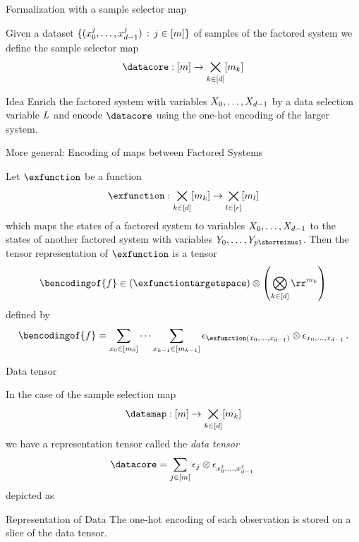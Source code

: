 \documentclass{beamer}
\begin{document}
    \begin{frame}{Formalization with a sample selector map}

        Given a dataset $\{({x_{0}^{j},\ldots,x_{d-1}^{j}}) \, : \, j\in[m] \}$ of samples of the factored system we define the sample selector map
        \[ \datacore : [\datanum] \rightarrow \facstates \]

        \medskip

        \begin{block}{Idea}
            Enrich the factored system with variables $X_{0},\ldots,X_{d-1}$ by a data selection variable $L$ and encode $\datacore$ using the one-hot encoding of the larger system.
        \end{block}


    \end{frame}


    \begin{frame}{More general: Encoding of maps between Factored Systems}

        \begin{definition}
            Let $\exfunction$ be a function
            \[ \exfunction : \facstates \rightarrow  \secfacstates \]
            which maps the states of a factored system to variables $X_{0},\ldots,X_{d-1}$ to the states of another factored system with variables $\seccatvariables$.
            Then the tensor representation of $\exfunction$ is a tensor
            \[ \bencodingof{\exformula} \in \left(\exfunctiontargetspace\right)  \otimes \left(\facspace\right) \]
            defined by
            \[ \bencodingof{\exformula} = \sum_{\catindexofin{0}} \cdots  \sum_{\catindexofin{\atomenumerator-1}}  \onehotmapof{\exfunction(\catindices)} \otimes \onehotmapof{\catindices} \, . \]
        \end{definition}

    \end{frame}



    \begin{frame}{Data tensor}

        In the case of the sample selection map
        \[ \datamap : [\datanum] \rightarrow \facstates \]
        we have a representation tensor called the \emph{data tensor}
        \[ \datacore = \sum_{\datindexin} \onehotmapof{\datindex} \otimes \onehotmapof{\catindicesof{\datindex}} \,  \]
        depicted as
        \begin{center}
        \end{center}

        \begin{block}{Representation of Data}
            The one-hot encoding of each observation is stored on a slice of the data tensor.
        \end{block}

    \end{frame}
\end{document}
